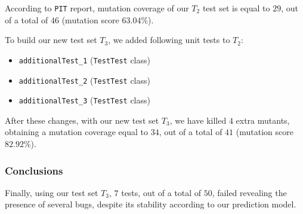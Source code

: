 \documentclass[sigconf]{acmart}
\begin{document}
According to \texttt{PIT} report, mutation coverage of our $T_2$ test set is equal to $29$, out of a total of $46$ (mutation score $63.04 \%$). 

To build our new test set $T_3$, we added following unit tests to $T_2$:

\begin{itemize}
\item \texttt{additionalTest\_1} (\texttt{TestTest} class)
\item \texttt{additionalTest\_2} (\texttt{TestTest} class)
\item \texttt{additionalTest\_3} (\texttt{TestTest} class)
\end{itemize}

After these changes, with our new test set $T_3$, we have killed $4$ extra mutants, obtaining a mutation coverage equal to $34$, out of a total of $41$ (mutation score $82.92 \%$).

\subsubsection{Conclusions}

Finally, using our test set $T_3$, $7$ tests, out of a total of $50$, failed revealing the presence of several bugs, despite its stability according to our prediction model.



\end{document}
